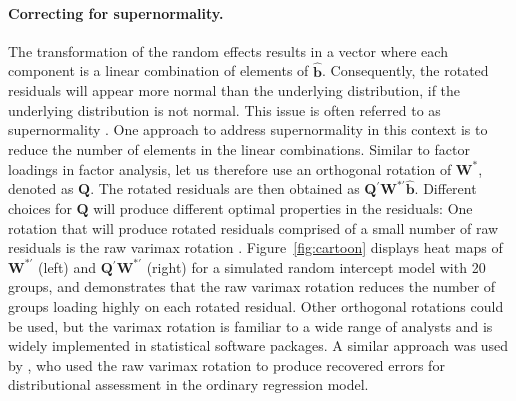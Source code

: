 \documentclass[12pt]{article} %
\newcommand{\hh}[1]{{\color{orange} #1}}
\newcommand{\al}[1]{{\color{red} #1}}
\newcommand{\trans}{\ensuremath{^\prime}}
\begin{document}
\paragraph{Correcting for supernormality.}
The transformation of the random effects results in a vector where each component is a linear combination of elements of $\widehat{\bm{b}}$. Consequently, the rotated residuals will appear more normal than the underlying distribution, if the underlying distribution is not normal. This issue is often referred to as supernormality \citep{Atkinson:1985}. One approach to address supernormality in this context is to reduce the number of elements in the linear combinations.
Similar to factor loadings in factor analysis, let us therefore use an orthogonal rotation of $\bm{W}^*$, denoted as $\bm{Q}$.
The rotated residuals are then obtained as $\bm{Q}\trans \bm{W}^{*\prime} \widehat{\bm{b}}$. 
Different choices for  $\bm{Q}$ will produce different optimal properties in the residuals:
One rotation that will produce rotated residuals comprised of a small number of raw residuals is the raw varimax rotation \citep{Johnson:2007}. Figure~\ref{fig:cartoon} displays heat maps of $\bm{W}^{*\prime}$ (left) and $\bm{Q}\trans\bm{W}^{*\prime}$ (right) for a simulated random intercept model with 20 groups, and demonstrates that the raw varimax rotation reduces the number of groups loading highly on each rotated residual. %
Other orthogonal rotations could be used, but the varimax rotation is familiar to a wide range of analysts and is widely implemented in statistical software packages. A similar approach was used by \cite{Jensen:1999iu}, who used the raw varimax rotation to produce recovered errors for distributional assessment in the ordinary regression model.
\end{document}
